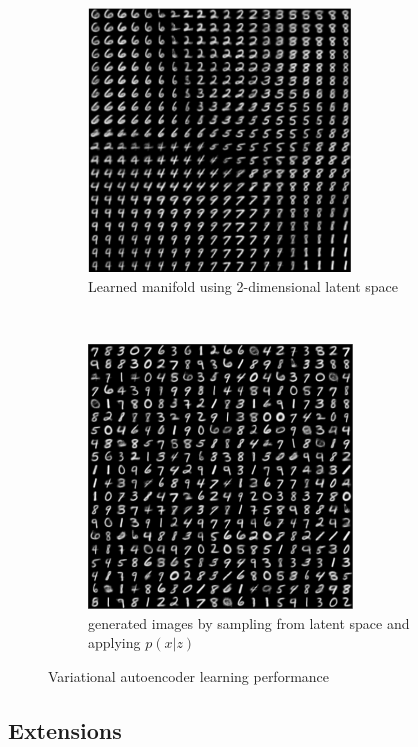 \begin{figure}[t!]
    \centering
    \begin{subfigure}[t]{0.5\textwidth}
        \centering
        \includegraphics[height=7cm]{media/vae_manifold.pdf}
        \caption{Learned manifold using 2-dimensional latent space}
    \end{subfigure}%
    ~
    \begin{subfigure}[t]{0.5\textwidth}
        \centering
        \includegraphics[height=7cm]{media/vae_samples.pdf}
        \caption{generated images by sampling from latent space and applying $p(x|z)$}
    \end{subfigure}
    \caption{Variational autoencoder learning performance}
\end{figure}


\newpage

\subsection{Extensions}
\label{sub:vae_extensions}

